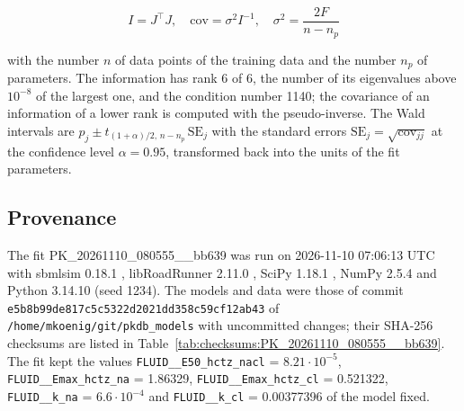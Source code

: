 \documentclass{article}
\begin{document}
\begin{equation}
I = J^\top J, \quad \mathrm{cov} = \sigma^2 I^{-1}, \quad \sigma^2 = \frac{2 F}{n - n_p}
\end{equation}

with the number $n$ of data points of the training data and the number $n_p$ of parameters. The information has rank 6 of 6, the number of its eigenvalues above $10^{-8}$ of the largest one, and the condition number 1140; the covariance of an information of a lower rank is computed with the pseudo-inverse. The Wald intervals are $\hat{p}_j \pm t_{(1+\alpha)/2,\, n-n_p}\, \mathrm{SE}_j$ with the standard errors $\mathrm{SE}_j = \sqrt{\mathrm{cov}_{jj}}$ at the confidence level $\alpha = 0.95$, transformed back into the units of the fit parameters.

\subsection{Provenance}

The fit PK\_20261110\_080555\_\_bb639 was run on 2026-11-10 07:06:13 UTC with sbmlsim 0.18.1 \cite{Koenig2026_sbmlsim}, libRoadRunner 2.11.0 \cite{Welsh2023}, SciPy 1.18.1 \cite{Virtanen2020}, NumPy 2.5.4 \cite{Harris2020} and Python 3.14.10 (seed 1234). The models and data were those of commit \texttt{e5b8b99de817c5c5322d2021dd358c59cf12ab43} of \texttt{/home/mkoenig/git/pkdb\_models} with uncommitted changes; their SHA-256 checksums are listed in Table~\ref{tab:checksums:PK_20261110_080555__bb639}. The fit kept the values \texttt{FLUID\_\_E50\_hctz\_nacl} = $8.21 \cdot 10^{-5}$, \texttt{FLUID\_\_Emax\_hctz\_na} = 1.86329, \texttt{FLUID\_\_Emax\_hctz\_cl} = 0.521322, \texttt{FLUID\_\_k\_na} = $6.6 \cdot 10^{-4}$ and \texttt{FLUID\_\_k\_cl} = 0.00377396 of the model fixed.
\end{document}
